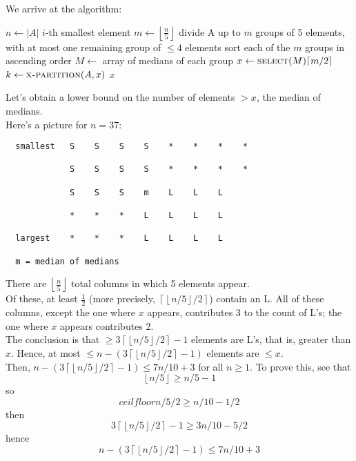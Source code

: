 \documentclass[12pt]{article}
\theoremstyle{plain}
\theoremstyle{definition}
\newcommand{\floor}[1]{\ensuremath{\left\lfloor #1 \right\rfloor}}
\newcommand{\ceil}[1]{\ensuremath{\left\lceil #1 \right\rceil}}
\begin{document}
We arrive at the algorithm:
\begin{algorithmic}
  \State $n \gets |A|$
    \State {}
    \State \Return $i$-th smallest element
  \Else
    \State $m \gets \floor{\frac{n}{5}}$
    \State divide A up to $m$ groups of 5 elements, with at most one remaining group of $\leq 4$ elements
    \State sort each of the $m$ groups in ascending order
    \State $M \gets$ array of medians of each group
    \State $x \gets \Call{select}{M}{\ceil{m/2}}$
    \State $k \gets \Call{x-partition}{A, x}$
      \State \Return $x$
      \State \Return {}
    \Else
      \State \Return {}
    \EndIf
  \EndIf
\EndFunction
\end{algorithmic}

Let's obtain a lower bound on the number of elements $> x$, the median of medians. \\
Here's a picture for $n = 37$:
\begin{verbatim}
  smallest   S    S    S    S    *    *    *    *

             S    S    S    S    *    *    *    *

             S    S    S    m    L    L    L

             *    *    *    L    L    L    L

  largest    *    *    *    L    L    L    L

  m = median of medians
\end{verbatim}

There are $\floor{\frac{n}{5}}$ total columns in which 5 elements appear. \\
Of these, at least $\frac{1}{2}$ (more precisely, $\ceil{\floor{n/5}/2}$) contain an L.
All of these columns, except the one where $x$ appears, contributes 3 to the count of L's; the one where $x$ appears contributes 2. \\

The conclusion is that $\geq 3\ceil{\floor{n/5}/2} - 1$ elements are L's, that is, greater than $x$.
Hence, at most $\leq n - (3\ceil{\floor{n/5}/2} - 1)$ elements are $\leq x$. \\

Then, $n - (3\ceil{\floor{n/5}/2} - 1) \leq 7n/10 + 3$ for all $n \geq 1$.
To prove this, see that
$$\floor{n/5} \geq n/5 - 1$$
so
$$ceil{floor{n/5}/2} \geq n/10 - 1/2$$
then
$$3\ceil{\floor{n/5}/2} - 1 \geq 3n/10 - 5/2$$
hence
$$n - (3\ceil{\floor{n/5}/2} - 1) \leq 7n/10 + 3$$
\end{document}
